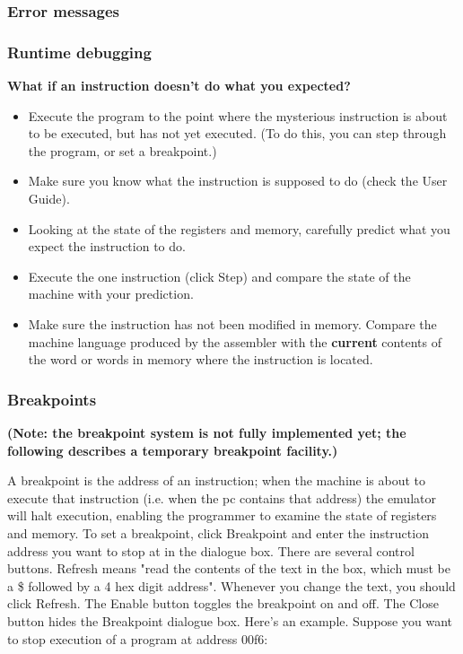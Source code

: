 \documentclass[11pt]{article}
\begin{document}
\subsubsection*{Error messages}
\label{sec:org441702a}

\subsubsection*{Runtime debugging}
\label{sec:org8881e29}

\textbf{What if an instruction doesn't do what you expected?}

\begin{itemize}
\item Execute the program to the point where the mysterious instruction is
about to be executed, but has not yet executed.  (To do this, you
can step through the program, or set a breakpoint.)

\item Make sure you know what the instruction is supposed to do (check the
User Guide).

\item Looking at the state of the registers and memory, carefully predict
what you expect the instruction to do.

\item Execute the one instruction (click Step) and compare the state of
the machine with your prediction.

\item Make sure the instruction has not been modified in memory.  Compare
the machine language produced by the assembler with the \textbf{current}
contents of the word or words in memory where the instruction is
located.
\end{itemize}

\subsubsection*{Breakpoints}
\label{sec:org95fd1b7}

\textbf{(Note: the breakpoint system is not fully implemented yet; the
following describes a temporary breakpoint facility.)}

A breakpoint is the address of an instruction; when the machine is
about to execute that instruction (i.e. when the pc contains that
address) the emulator will halt execution, enabling the programmer to
examine the state of registers and memory.  To set a breakpoint, click
Breakpoint and enter the instruction address you want to stop at in
the dialogue box.  There are several control buttons.  Refresh means
"read the contents of the text in the box, which must be a \$ followed
by a 4 hex digit address".  Whenever you change the text, you should
click Refresh.  The Enable button toggles the breakpoint on and off.
The Close button hides the Breakpoint dialogue box.  Here's an
example.  Suppose you want to stop execution of a program at address
00f6:
\end{document}
